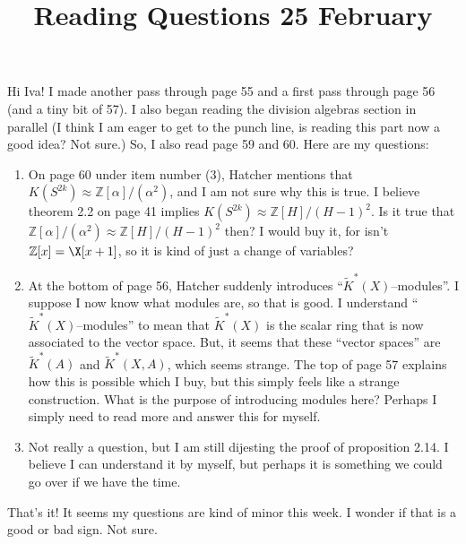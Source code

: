 \documentclass[12]{amsart}
\title{Reading Questions 25 February}
\newcommand{\RK}{\widetilde{K}}
\newcommand{\tiso}{\approx}
\newcommand{\Z}{\mathbb{Z}}
\begin{document}
\maketitle
Hi Iva! I made another pass through page 55 and a first pass through page 56 (and a tiny bit of 57).  I also began reading the division algebras section in parallel (I think I am eager to get to the punch line, is reading this part now a good idea? Not sure.) So, I also read page 59 and 60. Here are my questions:

\begin{enumerate}	

	\item On page 60 under item number (3), Hatcher mentions that $K(S^{2k}) \tiso \Z[\alpha]/(\alpha^2)$, and I am not sure why this is true. I believe theorem 2.2 on page 41 implies $K(S^{2k}) \tiso \Z[H]/(H-1)^2$. Is it true that $\Z[\alpha]/(\alpha^2) \tiso \Z[H]/(H-1)^2$ then? I would buy it, for isn't $\Z[x] = \X[x+1]$, so it is kind of just a change of variables?
	
		\item At the bottom of page 56, Hatcher suddenly introduces ``${\RK}^*(X)$--modules''. I suppose I now know what modules are, so that is good. I understand ``${\RK}^*(X)$--modules'' to mean that ${\RK}^*(X)$ is the scalar ring that is now associated to the vector space. But, it seems that these ``vector spaces'' are ${\RK}^*(A)$ and ${\RK}^*(X,A)$, which seems strange. The top of page 57 explains how this is possible which I buy, but this simply feels like a strange construction. What is the purpose of introducing modules here? Perhaps I simply need to read more and answer this for myself.
	
	\item Not really a question, but I am still dijesting the proof of proposition 2.14. I believe I can understand it by myself, but perhaps it is something we could go over if we have the time.
	
\end{enumerate}

	That's it! It seems my questions are kind of minor this week. I wonder if that is a good or bad sign. Not sure.
\end{document}
